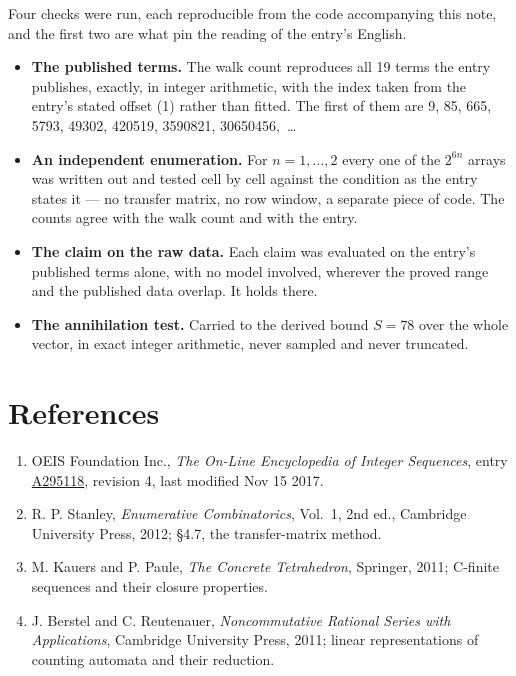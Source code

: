 \documentclass[11pt]{article}
\theoremstyle{definition}
\begin{document}
Four checks were run, each reproducible from the code accompanying this note, and the first two are what pin the reading of the entry's English.

\begin{itemize}

\item {\bfseries The published terms.} The walk count reproduces all 19 terms the entry publishes, exactly, in integer arithmetic, with the index taken from the entry's stated offset (1) rather than fitted. The first of them are 9, 85, 665, 5793, 49302, 420519, 3590821, 30650456,~\dots

\item {\bfseries An independent enumeration.} For $n = 1,\dots,2$ every one of the $2^{6n}$ arrays was written out and tested cell by cell against the condition as the entry states it --- no transfer matrix, no row window, a separate piece of code. The counts agree with the walk count and with the entry.

\item {\bfseries The claim on the raw data.} Each claim was evaluated on the entry's published terms alone, with no model involved, wherever the proved range and the published data overlap. It holds there.

\item {\bfseries The annihilation test.} Carried to the derived bound $S = 78$ over the whole vector, in exact integer arithmetic, never sampled and never truncated.

\end{itemize}

\section{References}

\begin{enumerate}

\item OEIS Foundation Inc., \emph{The On-Line Encyclopedia of Integer Sequences}, entry \href{https://oeis.org/A295118}{A295118}, revision 4, last modified Nov 15 2017.

\item R. P. Stanley, \emph{Enumerative Combinatorics}, Vol.~1, 2nd ed., Cambridge University Press, 2012; \S4.7, the transfer-matrix method.

\item M. Kauers and P. Paule, \emph{The Concrete Tetrahedron}, Springer, 2011; C-finite sequences and their closure properties.

\item J. Berstel and C. Reutenauer, \emph{Noncommutative Rational Series with Applications}, Cambridge University Press, 2011; linear representations of counting automata and their reduction.

\end{enumerate}
\end{document}

